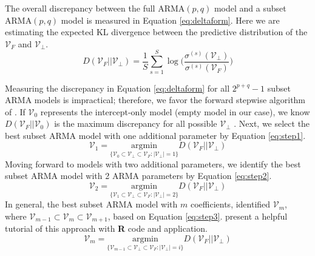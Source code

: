 The overall discrepancy between the full ARMA$(p,q)$ model and a subset ARMA$(p,q)$ model is measured in Equation \ref{eq:deltaform}. Here we are estimating the expected KL divergence between the predictive distribution of the $\mathcal{V}_F$ and $\mathcal{V}_\perp$.
\begin{equation}
\label{eq:deltaform}
	D(\mathcal{V}_F||\mathcal{V}_\perp)=\frac{1}{S}\sum\limits_{s=1}^S \log\bigg(\frac{\sigma^{(s)}(\mathcal{V}_\perp)}{\sigma^{(s)}(\mathcal{V}_F)}\bigg)
\end{equation}

Measuring the discrepancy in Equation \ref{eq:deltaform} for all $2^{p+q}-1$ subset ARMA models is impractical; therefore, we favor the forward stepwise algorithm of \cite{Peltola2014}. If $\mathcal{V}_0$ represents the intercept-only model (empty model in our case), we know $D(\mathcal{V}_F||\mathcal{V}_0)$ is the maximum discrepancy for all possible $\mathcal{V}_\perp$ \citep{Dupuis2003}. Next, we select the best subset ARMA model with one additional parameter by Equation \ref{eq:step1}.
\begin{equation}
\label{eq:step1}
\mathcal{V}_1=\underset{\{\mathcal{V}_0\subset\mathcal{V}_\perp\subset \mathcal{V}_F :|\mathcal{V}_\perp|=1\}}{\textrm{argmin}}D(\mathcal{V}_F||\mathcal{V}_\perp)
\end{equation}
Moving forward to models with two additional parameters, we identify the best subset ARMA model with 2 ARMA parameters by Equation \ref{eq:step2}.
\begin{equation}
\label{eq:step2}
\mathcal{V}_2=\underset{\{\mathcal{V}_1\subset\mathcal{V}_\perp\subset \mathcal{V}_F :|\mathcal{V}_\perp|=2\}}{\textrm{argmin}}D(\mathcal{V}_F||\mathcal{V}_\perp)
\end{equation}
In general, the best subset ARMA model with $m$ coefficients, identified $\mathcal{V}_m$, where $\mathcal{V}_{m-1}\subset\mathcal{V}_m \subset \mathcal{V}_{m+1}$, based on Equation \ref{eq:step3}. \cite{Piironen2015} present a helpful tutorial of this approach with {\bf R} code and application.
\begin{equation}
\label{eq:step3}
\mathcal{V}_m=\underset{\{\mathcal{V}_{m-1}\subset\mathcal{V}_\perp\subset \mathcal{V}_F :|\mathcal{V}_\perp|=i\}}{\textrm{argmin}}D(\mathcal{V}_F||\mathcal{V}_\perp)
\end{equation}


